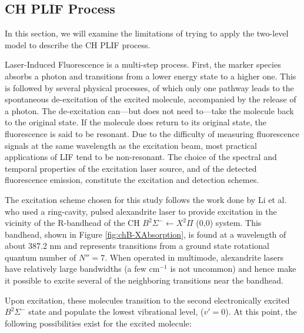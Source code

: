 \subsection{CH PLIF Process}
\label{subsec:background-ch-plif-process}

In this section, we will examine the limitations of trying to apply the two-level model to describe the CH PLIF process.

Laser-Induced Fluorescence is a multi-step process.
First, the marker species absorbs a photon and transitions from a lower energy state to a higher one.
This is followed by several physical processes, of which only one pathway leads to the spontaneous de-excitation of the excited molecule, accompanied by the release of a photon.
The de-excitation can---but does not need to---take the molecule back to the original state.
If the molecule does return to its original state, the fluorescence is said to be resonant.
Due to the difficulty of measuring fluorescence signals at the same wavelength as the excitation beam, most practical applications of LIF tend to be non-resonant.
The choice of the spectral and temporal properties of the excitation laser source, and of the detected fluorescence emission, constitute the excitation and detection schemes.

The excitation scheme chosen for this study follows the work done by Li et al.\cite{2007-li-a} who used a ring-cavity, pulsed alexandrite laser to provide excitation in the vicinity of the R-bandhead of the CH \(B^2\Sigma^- \leftarrow X^2\Pi\) (0,0) system.
This bandhead, shown in Figure \ref{fig:chB-XAbsorption}, is found at a wavelength of about 387.2 nm and represents transitions from a ground state rotational quantum number of \(N''=7\).
When operated in multimode, alexandrite lasers have relatively large bandwidths (a few cm\(^{-1}\) is not uncommon) and hence make it possible to excite several of the neighboring transitions near the bandhead.




Upon excitation, these molecules transition to the second electronically excited \(B^2\Sigma^-\) state and populate the lowest vibrational level, (\(v'=0\)).
At this point, the following possibilities exist for the excited molecule:


